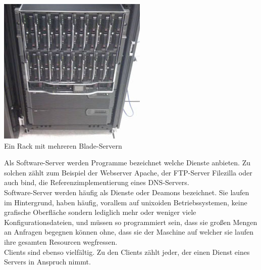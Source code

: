 \documentclass[11pt,a4paper]{report}
\begin{document}
\begin{center}
\includegraphics[scale=0.8]{../docs/tarkes/pics/ServerRack.jpg}\\
Ein Rack mit mehreren Blade-Servern 
\end{center}

Als Software-Server werden Programme bezeichnet welche Dienste anbieten. Zu solchen zählt zum Beispiel der Webserver Apache, der FTP-Server Filezilla oder auch bind, die Referenzimplementierung eines DNS-Servers.\\
Software-Server werden häufig als Dienste oder Deamons bezeichnet. Sie laufen im Hintergrund, haben häufig, vorallem auf unixoiden Betriebssystemen, keine grafische Oberfläche sondern lediglich mehr oder weniger viele Konfigurationsdateien, und müssen so programmiert sein, dass sie großen Mengen an Anfragen begegnen können ohne, dass sie der Maschine auf welcher sie laufen ihre gesamten Resourcen wegfressen.\\

Clients sind ebenso vielfältig. Zu den Clients zählt jeder, der einen Dienst eines Servers in Anspruch nimmt. 
\end{document}
